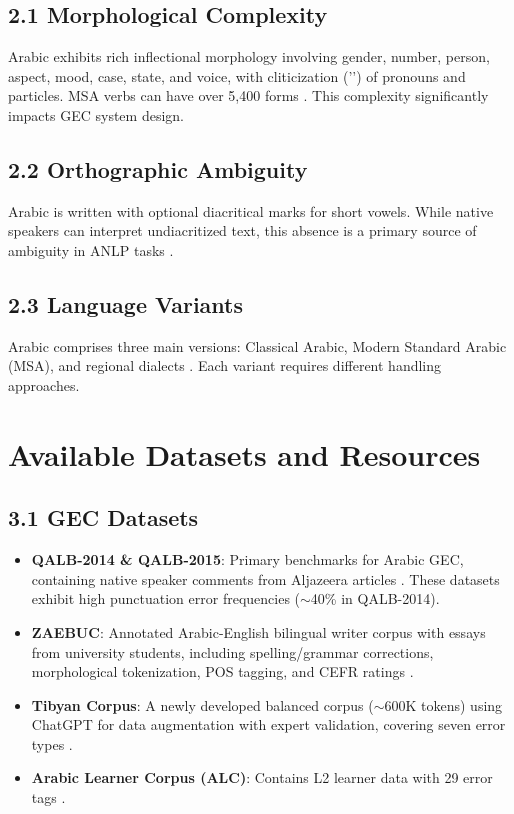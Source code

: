 \documentclass{article}
\begin{document}
\subsection*{2.1 Morphological Complexity}
Arabic exhibits rich inflectional morphology involving gender, number, person, aspect, mood, case, state, and voice, with cliticization ('') of pronouns and particles.  MSA verbs can have over 5,400 forms \cite{obeid2020camel}. This complexity significantly impacts GEC system design.

\subsection*{2.2 Orthographic Ambiguity}
Arabic is written with optional diacritical marks for short vowels. While native speakers can interpret undiacritized text, this absence is a primary source of ambiguity in ANLP tasks \cite{obeid2020camel}. 

\subsection*{2.3 Language Variants}
Arabic comprises three main versions: Classical Arabic, Modern Standard Arabic (MSA), and regional dialects \cite{alrehili2025tibyan}. Each variant requires different handling approaches.

\section{\textcolor{accentred}{Available Datasets and Resources}}

\subsection*{3.1 GEC Datasets}
\begin{itemize}
    \item \textbf{QALB-2014 \& QALB-2015}: Primary benchmarks for Arabic GEC, containing native speaker comments from Aljazeera articles \cite{zaghouani2015sahsoh}. These datasets exhibit high punctuation error frequencies ($\sim$40\% in QALB-2014).
    \item \textbf{ZAEBUC}: Annotated Arabic-English bilingual writer corpus with essays from university students, including spelling/grammar corrections, morphological tokenization, POS tagging, and CEFR ratings \cite{habash2022zaebuc}.
    \item \textbf{Tibyan Corpus}: A newly developed balanced corpus ($\sim$600K tokens) using ChatGPT for data augmentation with expert validation, covering seven error types \cite{alrehili2025tibyan}.
    \item \textbf{Arabic Learner Corpus (ALC)}: Contains L2 learner data with 29 error tags \cite{alfaifi2014alc}.
\end{itemize}
\end{document}
